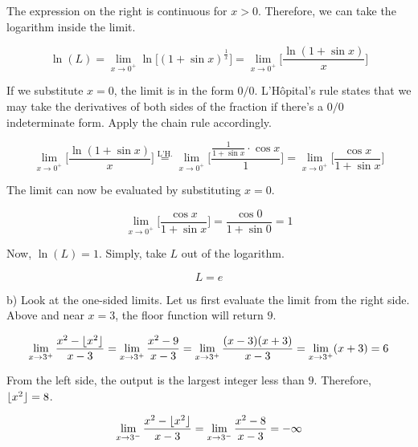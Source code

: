 \documentclass{article}
\DeclarePairedDelimiter\floor{\lfloor}{\rfloor}
\begin{document}
\hfill

\noindent The expression on the right is continuous for $x>0$. Therefore, we can take the logarithm inside the limit.

\begin{equation*}\ln(L) = \lim_{x\to 0^+} \ln\Big[(1+\sin x)^{\frac{1}{x}}\Big] = \lim_{x\to 0^+} \Big[\frac{\ln(1+\sin x)}{x}\Big] \end{equation*}

\hfill

\noindent If we substitute $x=0$, the limit is in the form $0/0$. L'Hôpital's rule states that we may take the derivatives of both sides of the fraction if there's a $0/0$ indeterminate form. Apply the chain rule accordingly.

\begin{equation*}\lim_{x\to 0^+} \Big[\frac{\ln(1+\sin x)}{x}\Big] \overset{\text{L'H.}}{=} \lim_{x\to 0^+} \Big[\frac{\frac{1}{1+\sin x} \cdot \cos x}{1}\Big] = \lim_{x\to 0^+} \Big[\frac{\cos x}{1+\sin x}\Big] \end{equation*}

\hfill

\noindent The limit can now be evaluated by substituting $x=0$.

\begin{equation*}\lim_{x\to 0^+} \Big[\frac{\cos x}{1+\sin x}\Big] = \frac{\cos 0}{1 + \sin 0 } =1\end{equation*}

\hfill

\noindent Now, $\ln(L) = 1$. Simply, take $L$ out of the logarithm.

\begin{equation*} \boxed{L = e}\end{equation*}

\hfill

\noindent b) Look at the one-sided limits. Let us first evaluate the limit from the right side. Above and near $x=3$, the floor function will return $9$.

\begin{equation*} \lim_{x\to 3^+} \frac{x^2-\floor{x^2}}{x-3} = \lim_{x\to 3^+}\frac{x^2-9}{x-3} = \lim_{x\to 3^+}\frac{(x-3)(x+3)}{x-3} = \lim_{x\to 3^+}(x+3)= 6\end{equation*}

\hfill

\noindent From the left side, the output is the largest integer less than $9$. Therefore, $\floor{x^2} = 8$.

\begin{equation*} \lim_{x\to 3^-} \frac{x^2-\floor{x^2}}{x-3} = \lim_{x\to 3^-}\frac{x^2-8}{x-3} = -\infty\end{equation*}
\end{document}

